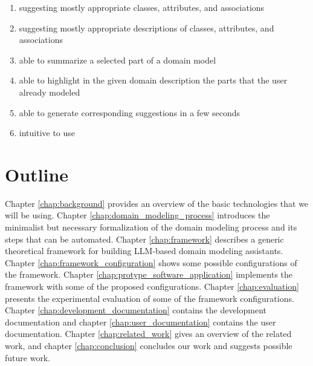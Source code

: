 \begin{enumerate}
\item suggesting mostly appropriate classes, attributes, and associations
\item suggesting mostly appropriate descriptions of classes, attributes, and associations
\item able to summarize a selected part of a domain model
\item able to highlight in the given domain description the parts that the user already modeled
\item able to generate corresponding suggestions in a few seconds
\item intuitive to use
\end{enumerate}


\section*{Outline}

Chapter \ref{chap:background} provides an overview of the basic technologies that we will be using.
Chapter \ref{chap:domain_modeling_process} introduces the minimalist but necessary formalization of the domain modeling process and its steps that can be automated.
Chapter \ref{chap:framework} describes a generic theoretical framework for building LLM-based domain modeling assistants.
Chapter \ref{chap:framework_configuration} shows some possible configurations of the framework.
Chapter \ref{chap:protype_software_application} implements the framework with some of the proposed configurations.
Chapter \ref{chap:evaluation} presents the experimental evaluation of some of the framework configurations.
Chapter \ref{chap:development_documentation} contains the development documentation and chapter \ref{chap:user_documentation} contains the user documentation. Chapter \ref{chap:related_work} gives an overview of the related work, and chapter \ref{chap:conclusion} concludes our work and suggests possible future work.